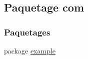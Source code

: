 \hypertarget{namespacecom}{}\subsection{Paquetage com}
\label{namespacecom}
\subsubsection*{Paquetages}
\begin{DoxyCompactItemize}
\item 
package \hyperlink{namespacecom_1_1example}{example}
\end{DoxyCompactItemize}
